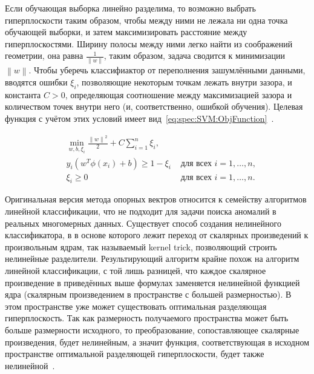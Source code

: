 Если обучающая выборка линейно разделима, то возможно выбрать гиперплоскости таким образом, чтобы между ними не лежала ни одна точка обучающей выборки, и затем максимизировать расстояние между гиперплоскостями. Ширину полосы между ними легко найти из соображений геометрии, она равна $\frac{1}{\left\|w\right\|}$, таким образом, задача сводится к минимизации $\left\|w\right\|$. Чтобы уберечь классифиактор от переполнения зашумлёнными данными, вводятся ошибки $\xi_i$, позволяющие некоторым точкам лежать внутри зазора, и константа $C > 0$, определяющая соотношение между максимизацией зазора и количеством точек внутри него (и, соответственно, ошибкой обучения). Целевая функция с учётом этих условий имеет вид~\eqref{eq:spec:SVM:ObjFunction}~\cite{RoemerIntroToOneClassSVM}.

\begin{equation} \label{eq:spec:SVM:ObjFunction}
\begin{aligned}
&\min_{w,b,\xi_i} \frac{{\left\|w\right\|}^2}{2} + C \sum_{i=1}^{n} \xi_i \text{,} \\
&y_i(w^T \phi(x_i) + b) \geq 1 - \xi_i &\text{ для всех } i = 1,\dots,n \text{,} \\
&\xi_i \geq 0 &\text{ для всех } i = 1,\dots,n \text{.}
\end{aligned}
\end{equation}

Оригинальная версия метода опорных вектров относится к семейству алгоритмов линейной классификации, что не подходит для задачи поиска аномалий в реальных многомерных данных. Существует способ создания нелинейного классификатора, в в основе которого лежит переход от скалярных произведений к произвольным ядрам, так называемый kernel trick, позволяющий строить нелинейные разделители. Результирующий алгоритм крайне похож на алгоритм линейной классификации, с той лишь разницей, что каждое скалярное произведение в приведённых выше формулах заменяется нелинейной функцией ядра (скалярным произведением в пространстве с большей размерностью). В этом пространстве уже может существовать оптимальная разделяющая гиперплоскость. Так как размерность получаемого пространства может быть больше размерности исходного, то преобразование, сопоставляющее скалярные произведения, будет нелинейным, а значит функция, соответствующая в исходном пространстве оптимальной разделяющей гиперплоскости, будет также нелинейной~\cite{LifshitsInternetAlgorithms}.